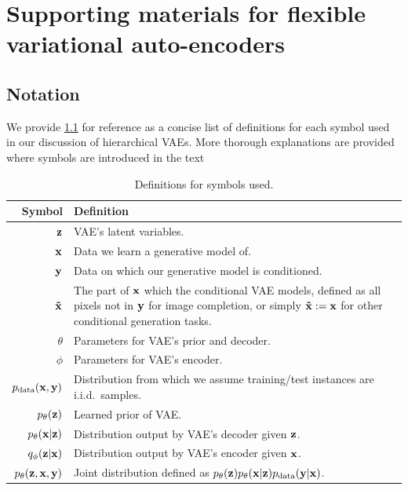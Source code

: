 \chapter{Supporting materials for flexible variational auto-encoders}

\section{Notation}
We provide \cref{tab:cigcvae-notation} for reference as a concise list of definitions
for each symbol used in our discussion of hierarchical VAEs. More thorough explanations are provided where symbols are
introduced in the text

\begin{table}
  \caption{Definitions for symbols used.}
  \label{tab:cigcvae-notation}
  \centering
  \begin{tabular}{rp{11cm}}
    \toprule
    Symbol    & Definition   \\
    \midrule
    ${\mathbf{z}}$                                   & VAE's latent variables. \\
    ${\mathbf{x}}$                                & Data we learn a generative model of. \\
    ${\mathbf{y}}$                            & Data on which our generative model is conditioned. \\
    $\mathbf{\tilde{x}}{}$                           & The part of ${\mathbf{x}}$ which the conditional VAE models, defined as all pixels not in ${\mathbf{y}}$ for image completion, or simply $\mathbf{\tilde{x}} := {\mathbf{x}}$ for other conditional generation tasks. \\
    $\theta$                              & Parameters for VAE's prior and decoder. \\
    $\phi$                                & Parameters for VAE's encoder. \\
    $p_{\rm{data}} ({\mathbf{x}}, {\mathbf{y}})$            & Distribution from which we assume training/test instances are i.i.d.~samples. \\
    $p_\theta({\mathbf{z}})$                        & Learned prior of VAE. \\
    $p_\theta({\mathbf{x}}|{\mathbf{z}})$                   & Distribution output by VAE's decoder given ${\mathbf{z}}$. \\
    $q_\phi({\mathbf{z}}|{\mathbf{x}})$                           & Distribution output by VAE's encoder given ${\mathbf{x}}$. \\
    $p_\theta({\mathbf{z}}, {\mathbf{x}}, {\mathbf{y}})$        & Joint distribution defined as $p_\theta({\mathbf{z}})p_\theta({\mathbf{x}}|{\mathbf{z}})p_{\rm{data}} ({\mathbf{y}}|{\mathbf{x}})$. \\

\end{tabular}
\end{table}
